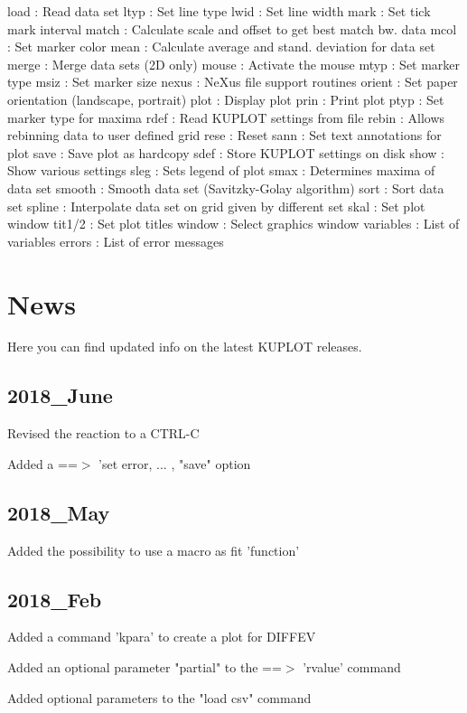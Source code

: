 \begin{MacVerbatim}
load          : Read data set
ltyp          : Set line type
lwid          : Set line width
mark          : Set tick mark interval
match         : Calculate scale and offset to get best match bw. data
mcol          : Set marker color
mean          : Calculate average and stand. deviation for data set
merge         : Merge data sets (2D only)
mouse         : Activate the mouse
mtyp          : Set marker type
msiz          : Set marker size
nexus         : NeXus file support routines
orient        : Set paper orientation (landscape, portrait)
plot          : Display plot
prin          : Print plot
ptyp          : Set marker type for maxima
rdef          : Read KUPLOT settings from file
rebin         : Allows rebinning data to user defined grid
rese          : Reset
sann          : Set text annotations for plot
save          : Save plot as hardcopy
sdef          : Store KUPLOT settings on disk
show          : Show various settings
sleg          : Sets legend of plot
smax          : Determines maxima of data set
smooth        : Smooth data set (Savitzky-Golay algorithm)
sort          : Sort data set
spline        : Interpolate data set on grid given by different set
skal          : Set plot window
tit1/2        : Set plot titles
window        : Select graphics window
variables     : List of variables
errors        : List of error messages
\end{MacVerbatim}
\section{News}
\par
Here you can find updated info on the latest KUPLOT releases. 
\subsection*{2018\_June}
\par
Revised the reaction to a CTRL-C 
\par
Added a ==$> $ 'set error, ... , "save" option 
\subsection*{2018\_May}
\par
Added the possibility to use a macro as fit 'function' 
\subsection*{2018\_Feb}
\par
Added a command 'kpara' to create a plot for DIFFEV 
\par
Added an optional parameter "partial" to the ==$> $ 'rvalue' command 
\par
Added optional parameters to the "load csv" command 
